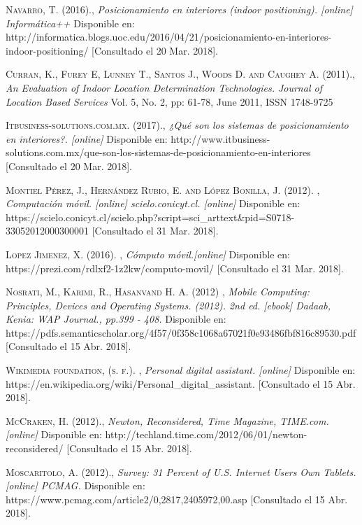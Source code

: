  \textsc{Navarro, T. (2016).}, 
\textit{Posicionamiento en interiores (indoor positioning). [online] Informática++ }
Disponible en: http://informatica.blogs.uoc.edu/2016/04/21/posicionamiento-en-interiores-indoor-positioning/ [Consultado el 20 Mar. 2018].

 \textsc{Curran, K.,  Furey E,  Lunney T.,  Santos J., Woods D. and Caughey A. (2011).}, 
\textit{An Evaluation of Indoor Location Determination Technologies. Journal of Location Based Services }
Vol. 5, No. 2, pp: 61-78, June 2011, ISSN 1748-9725

 \textsc{Itbusiness-solutions.com.mx. (2017).}, 
\textit{¿Qué son los sistemas de posicionamiento en interiores?. [online] }
Disponible en: http://www.itbusiness-solutions.com.mx/que-son-los-sistemas-de-posicionamiento-en-interiores [Consultado el 20 Mar. 2018].

 \textsc{ Montiel Pérez, J., Hernández Rubio, E. and López Bonilla, J. (2012). }, 
\textit{ Computación móvil. [online] scielo.conicyt.cl. [online] }
Disponible en: https://scielo.conicyt.cl/scielo.php?script=sci\_arttext\&pid=S0718-33052012000300001  [Consultado el 31 Mar. 2018].


 \textsc{ Lopez Jimenez, X. (2016). }, 
\textit{ Cómputo móvil.[online] }
Disponible en: https://prezi.com/rdlxf2-1z2kw/computo-movil/  [Consultado el 31 Mar. 2018].

 \textsc{ Nosrati, M., Karimi, R., Hasanvand H. A. (2012) }, 
\textit{Mobile Computing: Principles, Devices and Operating Systems. (2012). 2nd ed. [ebook] Dadaab, Kenia: WAP Journal., pp.399 - 408. }
Disponible en: https://pdfs.semanticscholar.org/4f57/0f358c1068a67021f0e93486fbf816c89530.pdf  [Consultado el 15 Abr. 2018].

 \textsc{Wikimedia foundation, (s. f.). }, 
\textit{ Personal digital assistant. [online] }
Disponible en: https://en.wikipedia.org/wiki/Personal\_digital\_assistant. [Consultado el 15 Abr. 2018].

 \textsc{McCraken, H. (2012).}, 
\textit{ Newton, Reconsidered, Time Magazine, TIME.com. [online] }
Disponible en: http://techland.time.com/2012/06/01/newton-reconsidered/ [Consultado el 15 Abr. 2018].

 \textsc{Moscaritolo, A. (2012).}, 
\textit{Survey: 31 Percent of U.S. Internet Users Own Tablets. [online] PCMAG. }
Disponible en: https://www.pcmag.com/article2/0,2817,2405972,00.asp [Consultado el 15 Abr. 2018].

